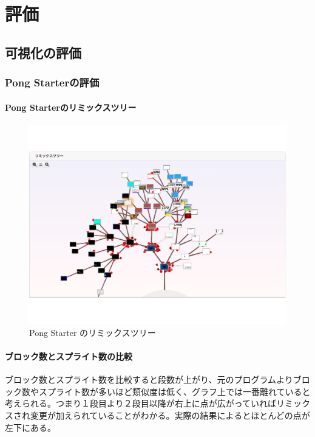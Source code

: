 \documentclass[a4paper,10pt,onecolumn,oneside,openany]{jsbook}
\begin{document}
 




\chapter{評価}

\section{可視化の評価}
\subsection{Pong Starterの評価}
\subsubsection{Pong Starterのリミックスツリー}
\begin{figure}[ht]
  \centering
    \includegraphics[scale=0.5]{graphic/remixtree_all.pdf}
  \caption{Pong Starter のリミックスツリー}
  \label{psrt}
 \end{figure}
\subsubsection{ブロック数とスプライト数の比較}
ブロック数とスプライト数を比較すると段数が上がり、元のプログラムよりブロック数やスプライト数が多いほど類似度は低く、グラフ上では一番離れていると考えられる。つまり１段目より２段目以降が右上に点が広がっていればリミックスされ変更が加えられていることがわかる。実際の結果によるとほとんどの点が左下にある。
\end{document}
